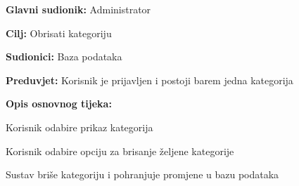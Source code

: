 				
					\noindent {}
					\begin{packed_item}
						
						\item \textbf{Glavni sudionik:} Administrator
						\item  \textbf{Cilj:} Obrisati kategoriju
						\item  \textbf{Sudionici:} Baza podataka
						\item  \textbf{Preduvjet:} Korisnik je prijavljen i postoji barem jedna kategorija
						\item  \textbf{Opis osnovnog tijeka:}
						
						\item[] \begin{packed_enum}
							
							\item Korisnik odabire prikaz kategorija
							\item Korisnik odabire opciju za brisanje željene kategorije
							\item Sustav briše kategoriju i pohranjuje promjene u bazu podataka
							
						\end{packed_enum}
						
					\end{packed_item}
				
